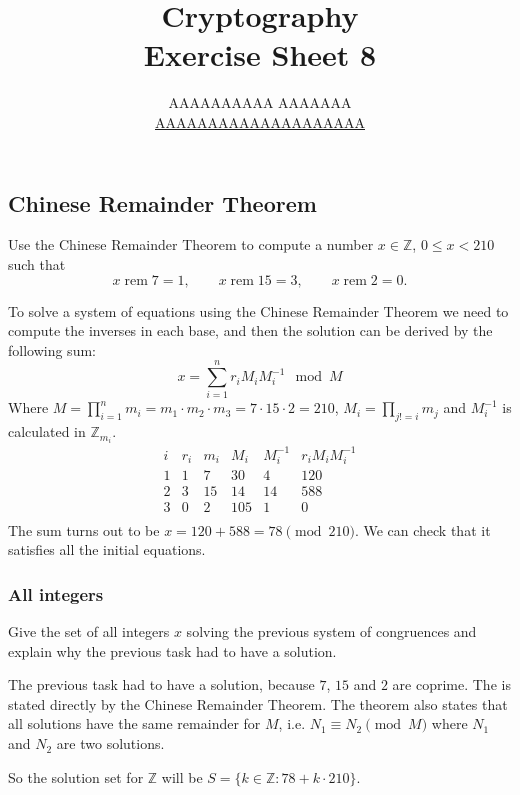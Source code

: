 \documentclass{article}
\title{Cryptography \\ Exercise Sheet 8}
\author{
  AAAAAAAAAA AAAAAAA \\
  \href{mailto:AAAAAAAAAAAAAAAAAAAA}{AAAAAAAAAAAAAAAAAAAA}
}
\newcommand{\Z}{\mathbb{Z}}
\begin{document}
  \maketitle

  \setcounter{section}{8}
  \subsection{Chinese Remainder Theorem}
  \begin{centerframebox}
    Use the Chinese Remainder Theorem to compute a number $x \in \Z$, $0 \leq x < 210$ such that
    \[ x \operatorname{rem} 7 = 1, \qquad x \operatorname{rem} 15 = 3, \qquad x \operatorname{rem} 2 = 0. \]
  \end{centerframebox}
  To solve a system of equations using the Chinese Remainder Theorem we need to compute the inverses in each base,
  and then the solution can be derived by the following sum:
  \[ x = \sum_{i=1}^n r_i M_i M_i^{-1} \mod M \]
  Where $M = \prod_{i=1}^n m_i = m_1 \cdot m_2 \cdot m_3 = 7 \cdot 15 \cdot 2 = 210$, $M_i = \prod_{j != i} m_j$
  and $M_i^{-1}$ is calculated in $\Z_{m_i}$.
  \[
    \begin{array}{c|c|c|c|c|c}
      i & r_i & m_i & M_i & M_i^{-1} & r_i M_i M_i^{-1} \\
      \hline
      1 & 1 & 7 & 30 & 4 & 120 \\
      2 & 3 & 15 & 14 & 14 & 588 \\
      3 & 0 & 2 & 105 & 1 & 0 \\
    \end{array}
  \]
  The sum turns out to be $x = 120+588 = 78 \pmod{210}$. We can check that it satisfies all the initial equations.

  \subsubsection{All integers}
  \begin{centerframebox}
    Give the set of all integers $x$ solving the previous system of congruences and explain why the previous task had to have a solution.
  \end{centerframebox}
  The previous task had to have a solution, because $7$, $15$ and $2$ are coprime.
  The is stated directly by the Chinese Remainder Theorem.
  The theorem also states that all solutions have the same remainder for $M$,
  i.e. $N_1 \equiv N_2 \pmod{M}$ where $N_1$ and $N_2$ are two solutions.

  So the solution set for $\Z$ will be $S = \{k \in \Z : 78 + k \cdot 210\}$.
\end{document}
